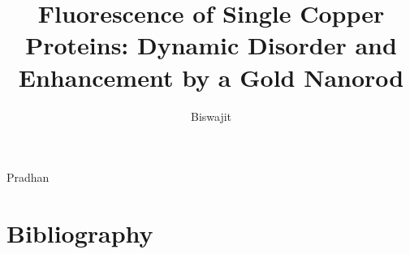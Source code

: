 \documentclass[]{dissertation}%
\begin{document}
\title[]{Fluorescence of Single Copper Proteins: Dynamic Disorder and Enhancement by a Gold Nanorod}
\author{Biswajit}{Pradhan}

%
\tableofcontents
\mainmatter
\thumbtrue





\newpage
\thumbfalse
\chapter*{Bibliography}


\end{document}
